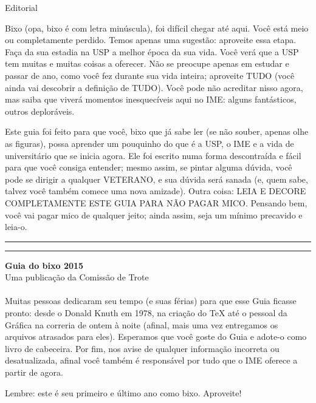 \begin{editorial}{Editorial}

Bixo (opa, bixo é com letra minúscula), foi difícil chegar até aqui. Você está
meio ou completamente perdido. Temos apenas uma sugestão: aproveite essa etapa.
Faça da sua estadia na USP a melhor época da sua vida. Você verá que a USP tem
muitas e muitas coisas a oferecer. Não se preocupe apenas em estudar e passar de
ano, como você fez durante sua vida inteira; aproveite TUDO (você ainda vai
descobrir a definição de TUDO). Você pode não acreditar nisso agora, mas saiba
que viverá momentos inesquecíveis aqui no IME: alguns fantásticos, outros deploráveis.

Este guia foi feito para que você, bixo que já sabe ler (se não souber, apenas olhe
as figuras), possa aprender um pouquinho do que é a USP, o IME e a vida de
universitário que se inicia agora. Ele foi escrito numa forma descontraída e
fácil para que você consiga entender; mesmo assim, se pintar alguma dúvida,
você pode se dirigir a qualquer VETERANO, e sua dúvida será sanada (e, quem sabe,
talvez você também comece uma nova amizade). Outra coisa: LEIA E DECORE
COMPLETAMENTE ESTE GUIA PARA NÃO PAGAR MICO. Pensando bem, você vai pagar mico
de qualquer jeito; ainda assim, seja um mínimo precavido e leia-o.

\rule{\textwidth}{0.5ex}\rule{2ex}{0.5ex}


{\large\bf Guia do bixo 2015} \\
Uma publicação da Comissão de Trote

\paragraph{}
Muitas pessoas dedicaram seu tempo (e suas férias) para que esse Guia ficasse pronto: desde o
Donald Knuth em 1978, na criação do \TeX\makebox{} até o pessoal da Gráfica na correria de
ontem à noite (afinal, mais uma vez entregamos os arquivos atrasados para eles).
Esperamos que você goste do Guia e adote-o como livro de cabeceira. Por fim,
nos avise de qualquer informação incorreta ou desatualizada, afinal você também é
responsável por tudo que o IME oferece a partir de agora.

Lembre: este é seu primeiro e último ano como bixo. Aproveite!


\end{editorial}
